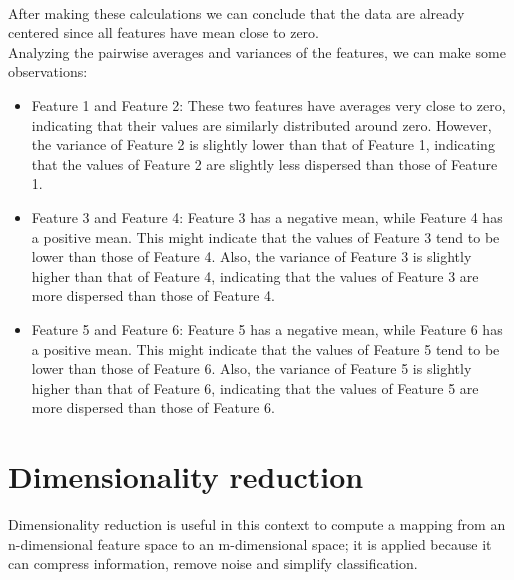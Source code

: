 \documentclass{article}
\begin{document}
    \\
After making these calculations we can conclude that the data are already centered since all features have mean close to zero.\\
Analyzing the pairwise averages and variances of the features, we can make some observations:  
\begin{itemize}
    \item Feature 1 and Feature 2: These two features have averages very close to zero, indicating that their values are similarly distributed around zero. However, the variance of Feature 2 is slightly lower than that of Feature 1, indicating that the values of Feature 2 are slightly less dispersed than those of Feature 1.  
    \item Feature 3 and Feature 4: Feature 3 has a negative mean, while Feature 4 has a positive mean. This might indicate that the values of Feature 3 tend to be lower than those of Feature 4. Also, the variance of Feature 3 is slightly higher than that of Feature 4, indicating that the values of Feature 3 are more dispersed than those of Feature 4.  
    \item Feature 5 and Feature 6: Feature 5 has a negative mean, while Feature 6 has a positive mean. This might indicate that the values of Feature 5 tend to be lower than those of Feature 6. Also, the variance of Feature 5 is slightly higher than that of Feature 6, indicating that the values of Feature 5 are more dispersed than those of Feature 6. 
\end{itemize}
\section{Dimensionality reduction}
Dimensionality reduction is useful in this context to compute a mapping from an n-dimensional feature space to an m-dimensional space; it is applied because it can compress information, remove noise and simplify classification.
\end{document}
